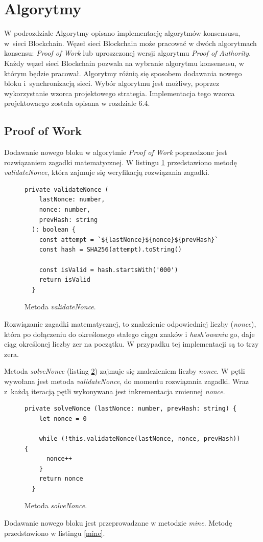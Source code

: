 \documentclass[a4paper,12pt]{book}
\begin{document}
\section{Algorytmy}

W podrozdziale Algorytmy opisano implementację algorytmów konsensusu, w~sieci Blockchain. Węzeł sieci Blockchain może pracować w dwóch algorytmach konsensu: \textit{Proof of Work} lub uproszczonej wersji algorytmu \textit{Proof of Authority}. Każdy węzeł sieci Blockchain pozwala na wybranie algorytmu konsensusu, w którym będzie pracował. Algorytmy różnią się sposobem dodawania nowego bloku i~synchronizacją sieci. Wybór algorytmu jest możliwy, poprzez wykorzystanie wzorca projektowego strategia. Implementacja tego wzorca projektowaego została opisana w rozdziale 6.4.

\subsection{Proof of Work}

Dodawanie nowego bloku w algorytmie \textit{Proof of Work} poprzedzone jest rozwiązaniem zagadki matematycznej. W listingu \ref{validateNonce} przedstawiono metodę \textit{validateNonce}, która zajmuje się weryfikacją rozwiązania zagadki.

\begin{figure}[H]  
  \centering
\begin{lstlisting}[style=ES6]
private validateNonce (
    lastNonce: number,
    nonce: number,
    prevHash: string
  ): boolean {
    const attempt = `${lastNonce}${nonce}${prevHash}`
    const hash = SHA256(attempt).toString()

    const isValid = hash.startsWith('000')
    return isValid
  }
\end{lstlisting}
\caption{Metoda \textit{validateNonce}.}
\label{validateNonce}
\end{figure}
Rozwiązanie zagadki matematycznej, to znalezienie odpowiedniej liczby (\textit{nonce}), która po dołączeniu do określonego stałego ciągu znaków i \textit{hash’owaniu} go, daje ciąg określonej liczby zer na początku. W przypadku tej implementacji są to trzy zera.
 
Metoda \textit{solveNonce} (listing \ref{solveNonce}) zajmuje się znalezieniem liczby \textit{nonce}. W pętli wywołana jest metoda \textit{validateNonce}, do momentu rozwiązania zagadki. Wraz z~każdą iteracją pętli wykonywana jest inkrementacja zmiennej \textit{nonce}.
 
\begin{figure}[H]  
  \centering
\begin{lstlisting}[style=ES6]
private solveNonce (lastNonce: number, prevHash: string) {
    let nonce = 0

    while (!this.validateNonce(lastNonce, nonce, prevHash)) {
      nonce++
    }
    return nonce
  }
\end{lstlisting}
\caption{Metoda \textit{solveNonce}.}
\label{solveNonce}
\end{figure}
Dodawanie nowego bloku jest przeprowadzane w metodzie \textit{mine}. Metodę przedstawiono w listingu \ref{mine}.
\end{document}
